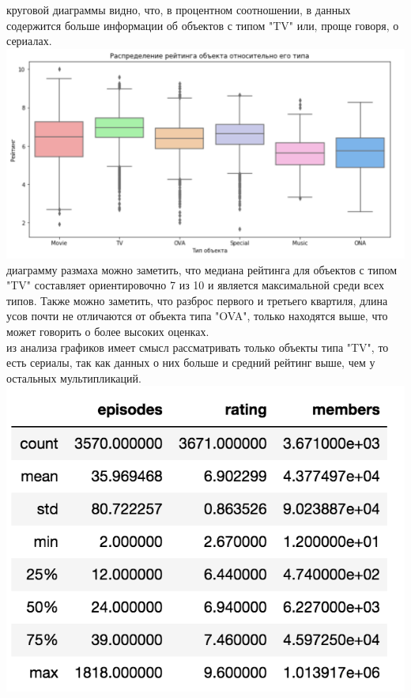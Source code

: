\documentclass{article}
\newcommand\tab[1][1cm]{\hspace*{#1}}
\begin{document}
 круговой диаграммы видно, что, в процентном соотношении, в данных содержится больше информации об объектов с типом "TV" или, проще говоря, о сериалах.\\
\includegraphics[scale=0.7]{f4.png}\\
 диаграмму размаха можно заметить, что медиана рейтинга для объектов с типом "TV" составляет ориентировочно 7 из 10 и является максимальной среди всех типов. Также можно заметить, что разброс первого и третьего квартиля, длина усов почти не отличаются от объекта типа "OVA", только находятся выше, что может говорить о более высоких оценках.\\
 из анализа графиков имеет смысл рассматривать только объекты типа "TV", то есть сериалы, так как данных о них больше и средний рейтинг выше, чем у остальных мультипликаций.\\
\tab\includegraphics[scale=0.8]{f5.png}\\
\end{document}
